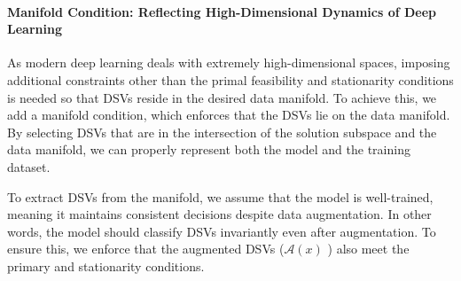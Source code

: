 \paragraph{Manifold Condition: Reflecting High-Dimensional Dynamics of Deep Learning}

As modern deep learning deals with extremely high-dimensional spaces, imposing additional constraints other than the primal feasibility and stationarity conditions is needed so that DSVs reside in the desired data manifold. To achieve this, we add a manifold condition, which enforces that the DSVs lie on the data manifold. By selecting DSVs that are in the intersection of the solution subspace and the data manifold, we can properly represent both the model and the training dataset.


To extract DSVs from the manifold, we assume that the model is well-trained, meaning it maintains consistent decisions despite data augmentation. In other words, the model should classify DSVs invariantly even after augmentation. To ensure this, we enforce that the augmented DSVs ($\mathcal{A}(x)$ ) also meet the primary and stationarity conditions.


